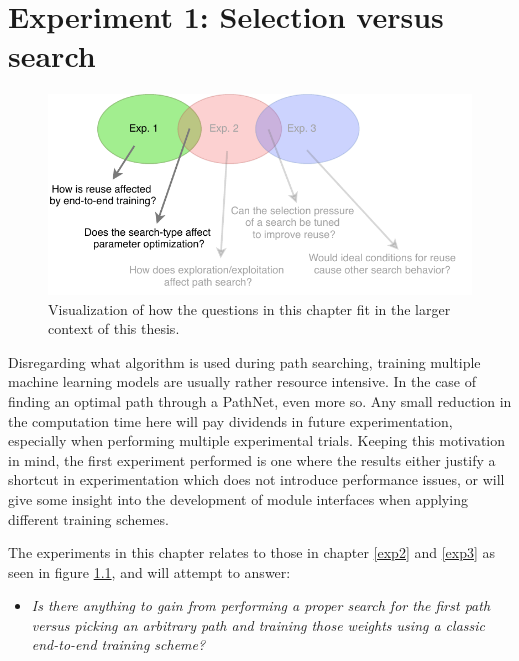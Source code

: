 \chapter{Experiment 1: Selection versus search}
\label{exp1}

\begin{figure}[th]
    \includegraphics[width=\textwidth]{Chapters/4.Experiments/exp1/figures/exp1.pdf}
    \caption[Experiment focus]{Visualization of how the questions in this chapter fit in the larger context of this thesis.}
    \label{fig:exp1.questions}
\end{figure}
\noindent
Disregarding what algorithm is used during path searching, training multiple machine learning models are usually rather resource intensive. In the case of finding an optimal path through a PathNet, even more so. Any small reduction in the computation time here will pay dividends in future experimentation, especially when performing multiple experimental trials. Keeping this motivation in mind, the first experiment performed is one where the results either justify a shortcut in experimentation which does not introduce performance issues, or will give some insight into the development of module interfaces when applying different training schemes.

The experiments in this chapter relates to those in chapter \ref{exp2} and \ref{exp3} as seen in figure \ref{fig:exp1.questions}, and will attempt to answer:
\begin{itemize}
    \item \emph{Is there anything to gain from performing a proper search for the first path versus picking an arbitrary path and training those weights using a classic end-to-end training scheme?}
\end{itemize}


